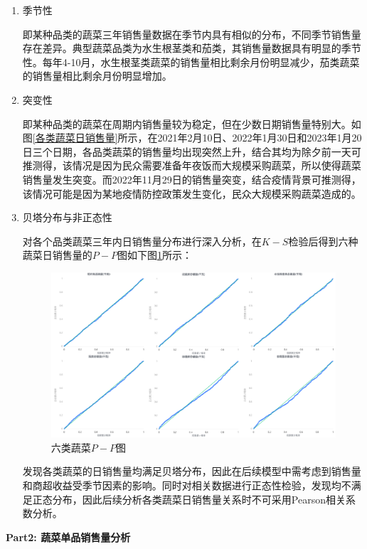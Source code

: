 \documentclass{my_paper}
\begin{document}
\begin{enumerate}
    \item 季节性\par
    即某种品类的蔬菜三年销售量数据在季节内具有相似的分布，不同季节销售量存在差异。典型蔬菜品类为水生根茎类和茄类，其销售量数据具有明显的季节性。每年4-10月，水生根茎类蔬菜的销售量相比剩余月份明显减少，茄类蔬菜的销售量相比剩余月份明显增加。
    \item 突变性\par
    即某种品类的蔬菜在周期内销售量较为稳定，但在少数日期销售量特别大。如图\ref{各类蔬菜日销售量}所示，在2021年2月10日、2022年1月30日和2023年1月20日三个日期，各品类蔬菜的销售量均出现突然上升，结合其均为除夕前一天可推测得，该情况是因为民众需要准备年夜饭而大规模采购蔬菜，所以使得蔬菜销售量发生突变。而2022年11月29日的销售量突变，结合疫情背景可推测得，该情况可能是因为某地疫情防控政策发生变化，民众大规模采购蔬菜造成的。
    \item 贝塔分布与非正态性\par
    对各个品类蔬菜三年内日销售量分布进行深入分析，在$K-S$检验后得到六种蔬菜日销售量的$P-P$图如下图\ref{p-p}所示：
    \begin{figure}[H]
     \centering
     \includegraphics[width=\textwidth]{p-p.png} %
     \caption{六类蔬菜$P-P$图} %
     \label{p-p} %
    \end{figure}\par    
    发现各类蔬菜的日销售量均满足贝塔分布，因此在后续模型中需考虑到销售量和商超收益受季节因素的影响。同时对相关数据进行正态性检验，发现均不满足正态分布，因此后续分析各类蔬菜日销售量关系时不可采用Pearson相关系数分析。
\end{enumerate}
\textbf{Part2: 蔬菜单品销售量分析}\par
\end{document}
